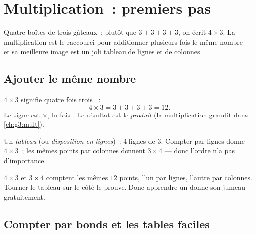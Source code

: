 \chapter{Multiplication~: premiers pas}\label{ch:g2:mult}

Quatre boîtes de trois gâteaux~: plutôt que
$3 + 3 + 3 + 3$, on écrit $4 \times 3$. La multiplication est le
raccourci pour additionner plusieurs fois le même nombre --- et sa
meilleure image est un joli tableau de lignes et de colonnes.

\section{Ajouter le même nombre}

\begin{definition}[Multiplication]\label{def:g2:mult:def}
$4 \times 3$ signifie \guillemotleft{} quatre fois trois
\guillemotright{}~:
\[
4 \times 3 = 3 + 3 + 3 + 3 = 12 .
\]
Le signe est $\times$, lu \guillemotleft{} fois \guillemotright{}.
Le résultat est le \emph{produit} (la multiplication grandit dans
\cref{ch:g3:mult}).
\end{definition}

\begin{omfigure}

{\small Un \emph{tableau} (ou \emph{disposition en lignes})~: $4$
lignes de $3$. Compter par lignes donne $4 \times 3$~; les mêmes
points par colonnes donnent $3 \times 4$ --- donc l'ordre n'a pas
d'importance.}
\end{omfigure}

\begin{example}\label{ex:g2:mult:order}
$4 \times 3$ et $3 \times 4$ comptent les mêmes $12$ points, l'un
par lignes, l'autre par colonnes. Tourner le tableau sur le côté
le prouve. Donc apprendre un  donne son jumeau gratuitement.
\end{example}

\section{Compter par bonds et les tables faciles}

